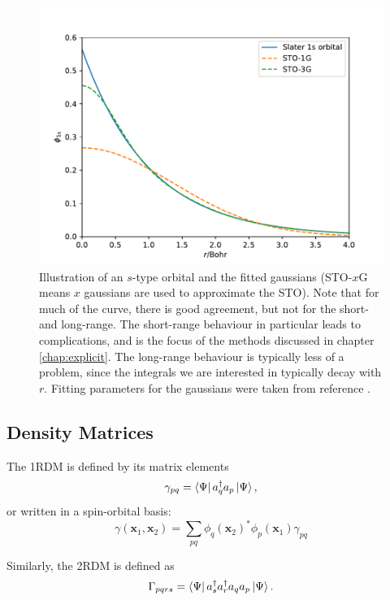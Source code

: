 \begin{figure}[htbp]
    \centering
    \includegraphics{figures/intro/gto-sto.pdf}
    \caption{Illustration of an $s$-type orbital and the fitted gaussians (STO-$x$G means $x$ gaussians are used to approximate the \gls{STO}). Note that for much of the curve, there is good agreement, but not for the short- and long-range. The short-range behaviour in particular leads to complications, and is the focus of the methods discussed in chapter \ref{chap:explicit}. The long-range behaviour is typically less of a problem, since the integrals we are interested in typically decay with $r$. Fitting parameters for the gaussians were taken from reference .}
    \label{fig:sto-gto}
\end{figure}

\subsection{Density Matrices}
\label{sec:density-matrices}

The \gls{1RDM} is defined by its matrix elements
\begin{equation}
    \gamma_{pq} = \bra{\Psi}a_q^\dag a_p \ket{\Psi},
\end{equation}
or written in a spin-orbital basis:
\begin{equation}
    \label{eq:one-rdm}
    \gamma(\bm x_1, \bm x_2) = \sum_{pq} \phi_q(\bm x_2)^*\phi_p(\bm x_1) \gamma_{pq}
\end{equation}

Similarly, the \gls{2RDM} is defined as
\begin{equation}
    \label{eq:two-rdm}
    \Gamma_{pqrs} = \bra{\Psi}a_s^\dag a_r^\dag a_q a_p \ket{\Psi}.
\end{equation}

